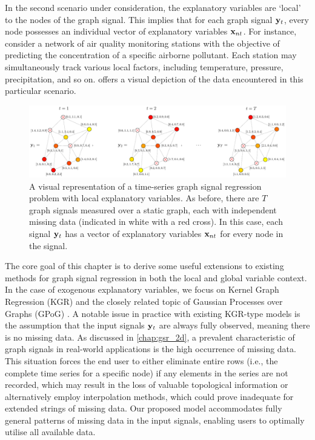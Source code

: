 In the second scenario under consideration, the explanatory variables are `local' to the nodes of the graph signal. This implies that for each graph signal $\mathbf{y}_t$, every node possesses an individual vector of explanatory variables $\mathbf{x}_{nt}$. For instance, consider a network of air quality monitoring stations with the objective of predicting the concentration of a specific airborne pollutant. Each station may simultaneously track various local factors, including temperature, pressure, precipitation, and so on.  offers a visual depiction of the data encountered in this particular scenario.

\begin{figure}[ht]
    \centering
    \includegraphics[width=\linewidth]{Figures/endogenous.pdf}
    \caption[Graph signal regression with local variables]{A visual representation of a time-series graph signal regression problem with local explanatory variables. As before, there are $T$ graph signals measured over a static graph, each with independent missing data (indicated in white with a red cross). In this case, each signal $\mathbf{y}_t$ has a vector of explanatory variables $\mathbf{x}_{nt}$ for every node in the signal. }
    \label{fig:RNC_diagram}
\end{figure}
  
The core goal of this chapter is to derive some useful extensions to existing methods for graph signal regression in both the local and global variable context. In the case of exogenous explanatory variables, we focus on Kernel Graph Regression (KGR) \citep{Venkitaraman2019,Elias2022} and the closely related topic of Gaussian Processes over Graphs (GPoG) \citep{Venkitaraman2020}. A notable issue in practice with existing KGR-type models is the assumption that the input signals $\mathbf{y}_t$ are always fully observed, meaning there is no missing data. As discussed in \cref{chap:gsr_2d}, a prevalent characteristic of graph signals in real-world applications is the high occurrence of missing data. This situation forces the end user to either eliminate entire rows (i.e., the complete time series for a specific node) if any elements in the series are not recorded, which may result in the loss of valuable topological information or alternatively employ interpolation methods, which could prove inadequate for extended strings of missing data. Our proposed model accommodates fully general patterns of missing data in the input signals, enabling users to optimally utilise all available data.

